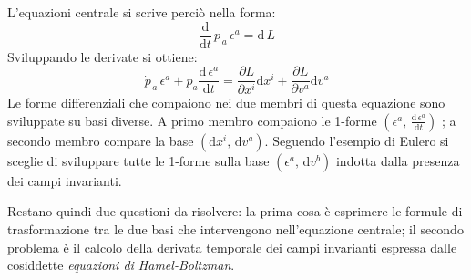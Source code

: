 \documentclass[11pt]{report}
\theoremstyle{plain}
\theoremstyle{definition}
\theoremstyle{remark}
\begin{document}
L'equazioni centrale si scrive perciò nella forma:
\begin{displaymath}
\frac{\textrm{d}}{\textrm{d}t} \, p_{\,a}\, \epsilon^{a} = \textrm{d}\, L
\end{displaymath}
Sviluppando le derivate si ottiene:
\begin{equation}\label{eq:centralebasiincasinate}
\dot{p}_{\,a} \, \epsilon^{a} + p_{a} \dfrac{\textrm{d} \, \epsilon ^{a}}{\textrm{d} t} = \dfrac{\partial L}{\partial x^{i}} \textrm{d}x^{i} + \dfrac{\partial L}{\partial v^{a}} \textrm{d}v^{a}
\end{equation}
Le forme differenziali che compaiono nei due membri di questa equazione sono sviluppate su basi diverse.
A primo membro compaiono le 1-forme $( \epsilon^{a}, \, \frac{\textrm{d} \, \epsilon^{a}}{\textrm{d} t} )$ ; a secondo membro compare la base $( \textrm{d} x^{i}, \, \textrm{d}v^{a} ) $.
Seguendo l'esempio di Eulero si sceglie di sviluppare tutte le 1-forme sulla base $(\epsilon^{a} , \, \textrm{d}v^{b}) $ indotta dalla presenza dei campi invarianti.

Restano quindi due questioni da risolvere: la prima cosa è esprimere le formule di trasformazione tra le due basi che intervengono nell'equazione centrale; il secondo problema è il calcolo della derivata temporale dei campi invarianti espressa dalle cosiddette \emph{equazioni di Hamel-Boltzman}.
\end{document}
